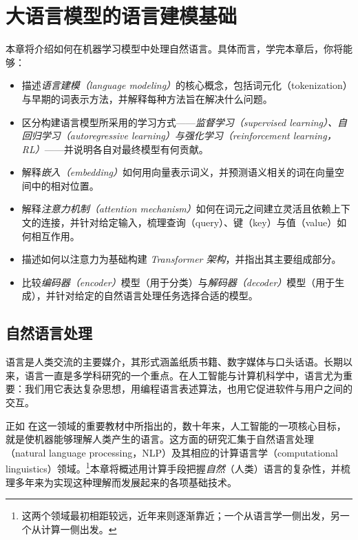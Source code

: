 \chapter[语言建模基础]{大语言模型的语言建模基础}\label{chap:llm}

\begin{learningbox}
本章将介绍如何在机器学习模型中处理自然语言。具体而言，学完本章后，你将能够：
\begin{itemize}[leftmargin=*, nosep]
    \item 描述{\em 语言建模（language modeling）}的核心概念，包括词元化（tokenization）与早期的词表示方法，并解释每种方法旨在解决什么问题。
    \item 区分构建语言模型所采用的学习方式——{\em 监督学习（supervised learning）、自回归学习（autoregressive learning）与强化学习（reinforcement learning，RL）}——并说明各自对最终模型有何贡献。
    \item 解释{\em 嵌入（embedding）}如何用向量表示词义，并预测语义相关的词在向量空间中的相对位置。
    \item 解释{\em 注意力机制（attention mechanism）}如何在词元之间建立灵活且依赖上下文的连接，并针对给定输入，梳理查询（query）、键（key）与值（value）如何相互作用。
    \item 描述如何以注意力为基础构建 {\em Transformer 架构}，并指出其主要组成部分。
    \item 比较{\em 编码器（encoder）}模型（用于分类）与{\em 解码器（decoder）}模型（用于生成），并针对给定的自然语言处理任务选择合适的模型。
\end{itemize}
\end{learningbox}

\section{自然语言处理}\label{sec:processinglanguage}
语言是人类交流的主要媒介，其形式涵盖纸质书籍、数字媒体与口头话语。长期以来，语言一直是多学科研究的一个重点。在人工智能与计算机科学中，语言尤为重要：我们用它表达复杂思想，用编程语言表述算法，也用它促进软件与用户之间的交互。

正如 \citet{jm3} 在这一领域的重要教材中所指出的，数十年来，人工智能的一项核心目标，就是使机器能够理解人类产生的语言。这方面的研究汇集于自然语言处理（natural language processing，NLP）及其相应的计算语言学（computational linguistics）领域。\footnote{这两个领域最初相距较远，近年来则逐渐靠近；一个从语言学一侧出发，另一个从计算一侧出发。}本章将概述用计算手段把握{\em 自然}（人类）语言的复杂性，并梳理多年来为实现这种理解而发展起来的各项基础技术。

